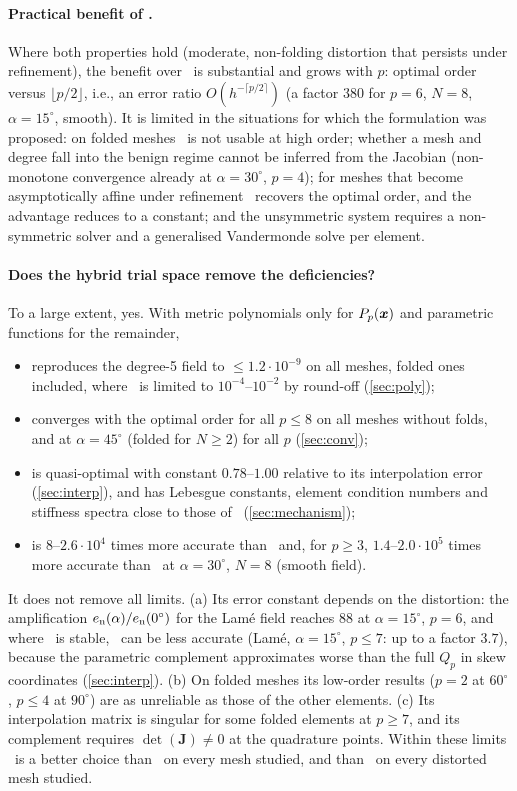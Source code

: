 \paragraph{Practical benefit of \PM.}
Where both properties hold (moderate, non-folding distortion that persists under
refinement), the benefit over \PP\ is substantial and grows with $p$: optimal order versus
$\lfloor p/2\rfloor$, i.e., an error ratio $O(h^{-\lceil p/2\rceil})$ (a factor $380$ for $p=6$,
$N=8$, $\alpha=15^\circ$, smooth). It is limited in the situations for which the formulation was
proposed: on folded meshes \PM\ is not usable at high order; whether a mesh and degree fall into
the benign regime cannot be inferred from the Jacobian (non-monotone convergence already at
$\alpha=30^\circ$, $p=4$); for meshes that become asymptotically affine under refinement \PP\
recovers the optimal order, and the advantage reduces to a constant; and the unsymmetric
system requires a non-symmetric solver and a generalised Vandermonde solve per element.

\paragraph{Does the hybrid trial space remove the deficiencies?}
To a large extent, yes. With metric polynomials only for $P_p(\bm{x})$ and parametric functions
for the remainder, \PH\
\begin{itemize}
\item reproduces the degree-5 field to $\le1.2\cdot10^{-9}$ on all meshes, folded ones included,
  where \PM\ is limited to $10^{-4}$--$10^{-2}$ by round-off (\cref{sec:poly});
\item converges with the optimal order for all $p\le8$ on all meshes without folds, and at
  $\alpha=45^\circ$ (folded for $N\ge2$) for all $p$ (\cref{sec:conv});
\item is quasi-optimal with constant $0.78$--$1.00$ relative to its interpolation error
  (\cref{sec:interp}), and has Lebesgue constants, element condition numbers and stiffness
  spectra close to those of \PP\ (\cref{sec:mechanism});
\item is $8$--$2.6\cdot10^4$ times more accurate than \PP\ and, for $p\ge3$, $1.4$--$2.0\cdot10^5$
  times more accurate than \PM\ at $\alpha=30^\circ$, $N=8$ (smooth field).
\end{itemize}
It does not remove all limits. (a) Its error constant depends on the distortion: the
amplification $e_{\mathrm{n}}(\alpha)/e_{\mathrm{n}}(0^\circ)$ for the Lam\'e field reaches $88$ at $\alpha=15^\circ$, $p=6$,
and where \PM\ is stable, \PH\ can be less accurate (Lam\'e, $\alpha=15^\circ$, $p\le7$: up to a
factor $3.7$), because the parametric complement approximates worse than the full $Q_p$ in skew
coordinates (\cref{sec:interp}). (b) On folded meshes its low-order results ($p=2$ at
$60^\circ$, $p\le4$ at $90^\circ$) are as unreliable as those of the other elements. (c) Its
interpolation matrix is singular for some folded elements at $p\ge7$, and its complement
requires $\det(\bm J)\ne0$ at the quadrature points. Within these limits \PH\ is a better choice
than \PM\ on every mesh studied, and than \PP\ on every distorted mesh studied.

